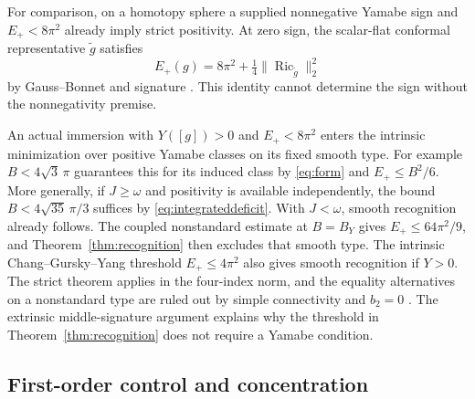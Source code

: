 \documentclass[11pt,letterpaper]{article}
\numberwithin{equation}{section}
\DeclareMathOperator{\Ric}{Ric}
\begin{document}
For comparison, on a homotopy sphere a supplied nonnegative
Yamabe sign and \(E_+<8\pi^2\) already imply strict positivity.
At zero sign, the scalar-flat conformal representative
\(\tilde g\) satisfies
\[
 E_+(g)=8\pi^2+\tfrac14\|\Ric_{\tilde g}\|_2^2
\]
by Gauss--Bonnet and signature \cite[(0.4)]{ChangGurskyYang2003}.
This identity cannot determine the sign without the
nonnegativity premise.

An actual immersion with \(Y([g])>0\) and \(E_+<8\pi^2\)
enters the intrinsic minimization over positive Yamabe
classes on its fixed smooth type. For example \(B<4\sqrt3\,\pi\)
guarantees this for its induced class by \eqref{eq:form}
and \(E_+\le B^2/6\). More generally, if \(J\ge\omega\)
and positivity is available independently, the bound
\(B<4\sqrt{35}\,\pi/3\) suffices by \eqref{eq:integrateddeficit}.
With \(J<\omega\), smooth recognition already follows.
The coupled nonstandard estimate at \(B=B_Y\) gives
\(E_+\le64\pi^2/9\), and Theorem~\ref{thm:recognition}
then excludes that smooth type. The intrinsic
Chang--Gursky--Yang threshold \(E_+\le4\pi^2\) also gives
smooth recognition if \(Y>0\). The strict theorem applies in
the four-index norm, and the equality alternatives on a
nonstandard type are ruled out by simple connectivity and
\(b_2=0\) \cite[Theorems A--B]{ChangGurskyYang2003}.
The extrinsic middle-signature argument explains why the
threshold in Theorem~\ref{thm:recognition} does not require a
Yamabe condition.

\subsection{First-order control and concentration}
\end{document}
